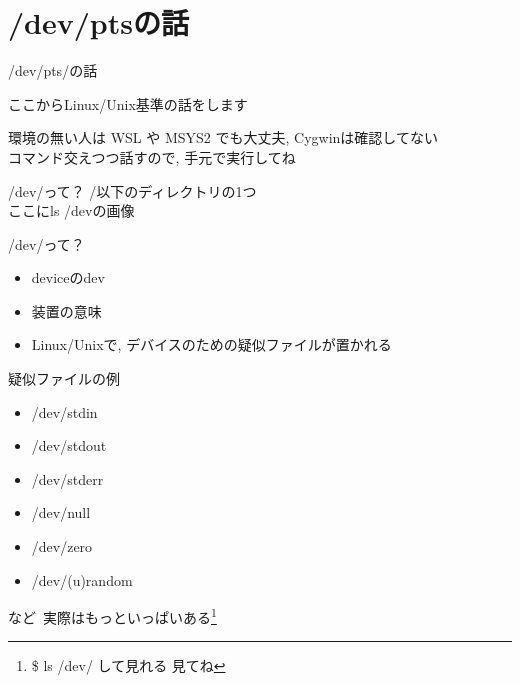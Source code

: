 \documentclass[uplatex, dvipdfmx, unicode]{beamer}
\begin{document}
\section{/dev/ptsの話}

\begin{frame}
  \Huge{\alert{/dev/pts/の話}}
\end{frame}

\begin{frame}
  \Large{\alert{ここからLinux/Unix基準の話をします}\faLinux} \\
  \vspace{0.2in}

  \normalsize
  環境の無い人は WSL や MSYS2 でも大丈夫, Cygwinは確認してない \\
  コマンド交えつつ話すので, 手元で実行してね
\end{frame}

\begin{frame}{/dev/って？}
  /以下のディレクトリの1つ \\
  \vspace{0.2in}
  ここにls /devの画像
\end{frame}

\begin{frame}{/dev/って？}
  \begin{itemize}
    \item{\alert{dev}iceのdev}
    \item{装置の意味}
    \item{Linux/Unixで, デバイスのための疑似ファイルが置かれる}
  \end{itemize}
\end{frame}

\begin{frame}{疑似ファイルの例}
  \begin{itemize}
    \item{/dev/stdin}
    \item{/dev/stdout}
    \item{/dev/stderr}
    \item{/dev/null}
    \item{/dev/zero}
    \item{/dev/(u)random}
  \end{itemize}
  \vspace{0.2in}
  など\ 実際はもっといっぱいある\footnote{\$ ls /dev/ して見れる 見てね}
\end{frame}
\end{document}
